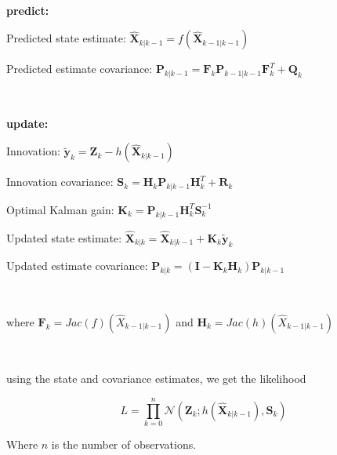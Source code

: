 \

\textbf{predict:}

Predicted state estimate: $\bm{\hat X}_{k|k-1} = f(\bm{\hat X}_{k-1|k-1} )$

Predicted estimate covariance: $\textbf{P}_{k|k-1} = \textbf{F}_k\textbf{P}_{k-1|k-1} \textbf{F}_k^T + \textbf{Q}_k$

\

\textbf{update:}

Innovation: $\bm{\tilde y}_{k} = \textbf{Z}_k - h(\bm{\hat X}_{k|k-1})$

Innovation covariance: $\textbf{S}_k = \textbf{H}_k \textbf{P}_{k|k-1}\textbf{H}_k^T + \textbf{R}_k$

Optimal Kalman gain: $\textbf{K}_k = \textbf{P}_{k|k-1} \textbf{H}_k^T \textbf{S}_k^{-1}$

Updated state estimate: $\bm{\hat X}_{k|k} = \bm{\hat X}_{k|k-1} + \textbf{K}_k \bm{\tilde y}_{k}$

Updated estimate covariance: $\textbf{P}_{k|k} = (\textbf{I} - \textbf{K}_k \textbf{H}_k)\textbf{P}_{k|k-1}$



\

where $\textbf{F}_k = Jac (f)(\hat{X}_{k-1|k-1})$ and $\textbf{H}_k = Jac( h)(\hat{X}_{k-1|k-1})$

\

using the state and covariance estimates, we get the likelihood 

$$L = \prod_{k=0}^n \mathcal{N}(\textbf{Z}_k; h(\hat{\textbf{X}}_{k|k-1}), \textbf{S}_k) \label{eq: EKF likelihood}$$

Where $n$ is the number of observations.
\parencite{kulikov_extended_2024}

